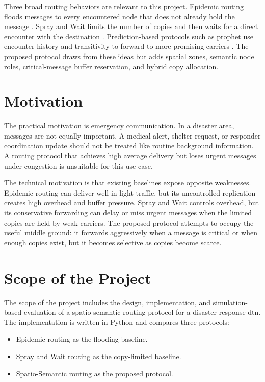Three broad routing behaviors are relevant to this project. Epidemic routing floods messages to every encountered node that does not already hold the message \citep{vahdat2000epidemic}. Spray and Wait limits the number of copies and then waits for a direct encounter with the destination \citep{spyropoulos2005spray}. Prediction-based protocols such as \ac{prophet} use encounter history and transitivity to forward to more promising carriers \citep{lindgren2012prophet}. The proposed protocol draws from these ideas but adds spatial zones, semantic node roles, critical-message buffer reservation, and hybrid copy allocation.

\section{Motivation}
The practical motivation is emergency communication. In a disaster area, messages are not equally important. A medical alert, shelter request, or responder coordination update should not be treated like routine background information. A routing protocol that achieves high average delivery but loses urgent messages under congestion is unsuitable for this use case.

The technical motivation is that existing baselines expose opposite weaknesses. Epidemic routing can deliver well in light traffic, but its uncontrolled replication creates high overhead and buffer pressure. Spray and Wait controls overhead, but its conservative forwarding can delay or miss urgent messages when the limited copies are held by weak carriers. The proposed protocol attempts to occupy the useful middle ground: it forwards aggressively when a message is critical or when enough copies exist, but it becomes selective as copies become scarce.

\section{Scope of the Project}
The scope of the project includes the design, implementation, and simulation-based evaluation of a spatio-semantic routing protocol for a disaster-response \ac{dtn}. The implementation is written in Python and compares three protocols:

\begin{itemize}
	\item Epidemic routing as the flooding baseline.
	\item Spray and Wait routing as the copy-limited baseline.
	\item Spatio-Semantic routing as the proposed protocol.
\end{itemize}

